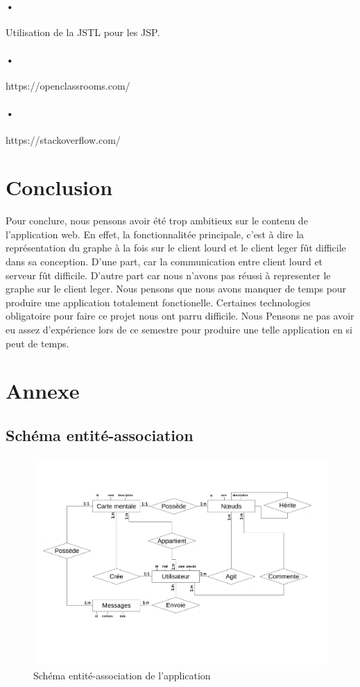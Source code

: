 \documentclass[11pt,a4paper]{article}
\begin{document}
\paragraph{•} Utilisation de la JSTL pour les JSP.
\paragraph{•} https://openclassrooms.com/
\paragraph{•} https://stackoverflow.com/

\section{Conclusion}
Pour conclure, nous pensons avoir été trop ambitieux sur le contenu de
l'application web. En effet, la fonctionnalitée principale, c'est à
dire la représentation du graphe à la fois sur le client lourd et le client
leger fût difficile dans sa conception. D'une part, car la communication
entre client lourd et serveur fût difficile. D'autre part car nous
n'avons pas réussi à representer le graphe sur le client leger. Nous
pensons que nous avons manquer de temps pour produire une application
totalement fonctionelle. Certaines technologies obligatoire pour faire
ce projet nous ont parru difficile. Nous Pensons ne pas avoir eu assez
d'expérience lors de ce semestre pour produire une telle application
en si peut de temps.  


\newpage
\section{Annexe}
\subsection{Schéma entité-association}
\begin{figure}[!h]
\includegraphics[angle=270, scale=0.6]{Image/Schema_entite_association.pdf}
\caption{Schéma entité-association de l'application}
\end{figure}
\newpage
\end{document}
